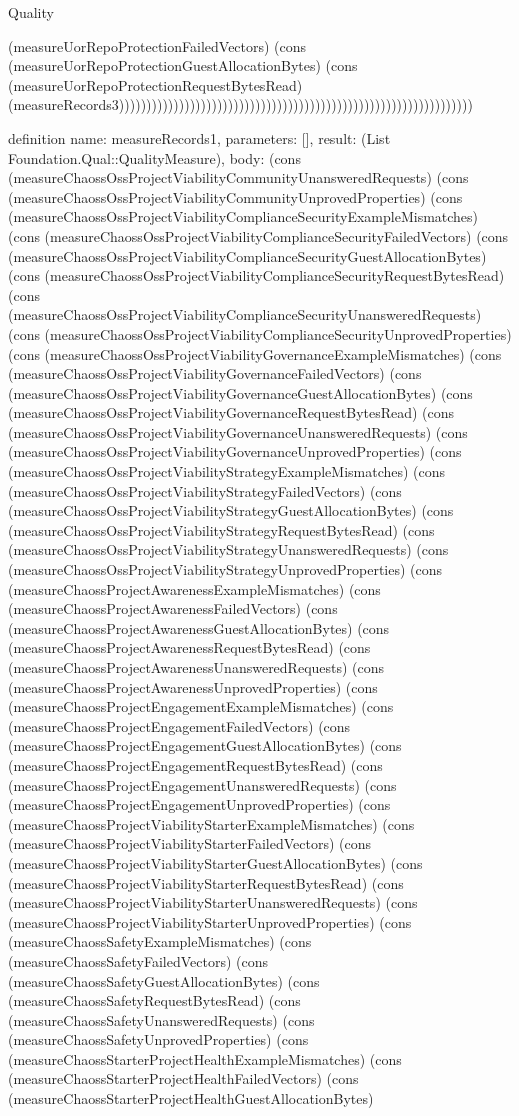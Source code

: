 \begin{lexlean}{Quality}
\begin{semanticmodule}
{(measureUorRepoProtectionFailedVectors) (cons (measureUorRepoProtectionGuestAllocationBytes) (cons (measureUorRepoProtectionRequestBytesRead) (measureRecords3)))))))))))))))))))))))))))))))))))))))))))))))))))))))))))))))))
}

definition{
  name: measureRecords1,
  parameters: [],
  result: (List Foundation.Qual::QualityMeasure),
  body: (cons (measureChaossOssProjectViabilityCommunityUnansweredRequests) (cons (measureChaossOssProjectViabilityCommunityUnprovedProperties) (cons (measureChaossOssProjectViabilityComplianceSecurityExampleMismatches) (cons (measureChaossOssProjectViabilityComplianceSecurityFailedVectors) (cons (measureChaossOssProjectViabilityComplianceSecurityGuestAllocationBytes) (cons (measureChaossOssProjectViabilityComplianceSecurityRequestBytesRead) (cons (measureChaossOssProjectViabilityComplianceSecurityUnansweredRequests) (cons (measureChaossOssProjectViabilityComplianceSecurityUnprovedProperties) (cons (measureChaossOssProjectViabilityGovernanceExampleMismatches) (cons (measureChaossOssProjectViabilityGovernanceFailedVectors) (cons (measureChaossOssProjectViabilityGovernanceGuestAllocationBytes) (cons (measureChaossOssProjectViabilityGovernanceRequestBytesRead) (cons (measureChaossOssProjectViabilityGovernanceUnansweredRequests) (cons (measureChaossOssProjectViabilityGovernanceUnprovedProperties) (cons (measureChaossOssProjectViabilityStrategyExampleMismatches) (cons (measureChaossOssProjectViabilityStrategyFailedVectors) (cons (measureChaossOssProjectViabilityStrategyGuestAllocationBytes) (cons (measureChaossOssProjectViabilityStrategyRequestBytesRead) (cons (measureChaossOssProjectViabilityStrategyUnansweredRequests) (cons (measureChaossOssProjectViabilityStrategyUnprovedProperties) (cons (measureChaossProjectAwarenessExampleMismatches) (cons (measureChaossProjectAwarenessFailedVectors) (cons (measureChaossProjectAwarenessGuestAllocationBytes) (cons (measureChaossProjectAwarenessRequestBytesRead) (cons (measureChaossProjectAwarenessUnansweredRequests) (cons (measureChaossProjectAwarenessUnprovedProperties) (cons (measureChaossProjectEngagementExampleMismatches) (cons (measureChaossProjectEngagementFailedVectors) (cons (measureChaossProjectEngagementGuestAllocationBytes) (cons (measureChaossProjectEngagementRequestBytesRead) (cons (measureChaossProjectEngagementUnansweredRequests) (cons (measureChaossProjectEngagementUnprovedProperties) (cons (measureChaossProjectViabilityStarterExampleMismatches) (cons (measureChaossProjectViabilityStarterFailedVectors) (cons (measureChaossProjectViabilityStarterGuestAllocationBytes) (cons (measureChaossProjectViabilityStarterRequestBytesRead) (cons (measureChaossProjectViabilityStarterUnansweredRequests) (cons (measureChaossProjectViabilityStarterUnprovedProperties) (cons (measureChaossSafetyExampleMismatches) (cons (measureChaossSafetyFailedVectors) (cons (measureChaossSafetyGuestAllocationBytes) (cons (measureChaossSafetyRequestBytesRead) (cons (measureChaossSafetyUnansweredRequests) (cons (measureChaossSafetyUnprovedProperties) (cons (measureChaossStarterProjectHealthExampleMismatches) (cons (measureChaossStarterProjectHealthFailedVectors) (cons (measureChaossStarterProjectHealthGuestAllocationBytes) }
\end{semanticmodule}
\end{lexlean}
